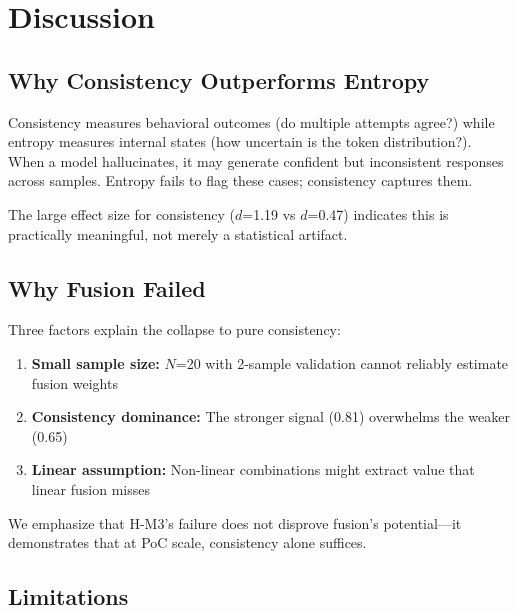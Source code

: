 \section{Discussion}

\subsection{Why Consistency Outperforms Entropy}

Consistency measures behavioral outcomes (do multiple attempts agree?) while entropy measures internal states (how uncertain is the token distribution?). When a model hallucinates, it may generate confident but inconsistent responses across samples. Entropy fails to flag these cases; consistency captures them.

The large effect size for consistency ($d$=1.19 vs $d$=0.47) indicates this is practically meaningful, not merely a statistical artifact.

\subsection{Why Fusion Failed}

Three factors explain the collapse to pure consistency:

\begin{enumerate}
    \item \textbf{Small sample size:} $N$=20 with 2-sample validation cannot reliably estimate fusion weights
    \item \textbf{Consistency dominance:} The stronger signal (0.81) overwhelms the weaker (0.65)
    \item \textbf{Linear assumption:} Non-linear combinations might extract value that linear fusion misses
\end{enumerate}

We emphasize that H-M3's failure does not disprove fusion's potential---it demonstrates that at PoC scale, consistency alone suffices.

\subsection{Limitations}

